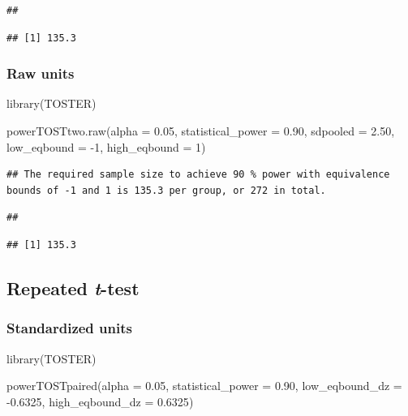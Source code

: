 \documentclass[
]{krantz}
\makeatletter
\newenvironment{Shaded}{\begin{snugshade}}{\end{snugshade}}
\newcommand{\AttributeTok}[1]{\textcolor[rgb]{0.61,0.61,0.61}{#1}}
\newcommand{\DecValTok}[1]{\textcolor[rgb]{0.06,0.06,0.06}{#1}}
\newcommand{\FloatTok}[1]{\textcolor[rgb]{0.06,0.06,0.06}{#1}}
\newcommand{\FunctionTok}[1]{\textcolor[rgb]{0,0,0}{#1}}
\newcommand{\NormalTok}[1]{#1}
\newcommand{\SpecialCharTok}[1]{\textcolor[rgb]{0,0,0}{#1}}
\newenvironment{kframe}{%
\medskip{}
\setlength{\fboxsep}{.8em}
 \def\at@end@of@kframe{}%
 \ifinner\ifhmode%
  \def\at@end@of@kframe{\end{minipage}}%
  \begin{minipage}{\columnwidth}%
 \fi\fi%
 \def\FrameCommand##1{\hskip\@totalleftmargin \hskip-\fboxsep
 \colorbox{shadecolor}{##1}\hskip-\fboxsep
     \hskip-\linewidth \hskip-\@totalleftmargin \hskip\columnwidth}%
 \MakeFramed {\advance\hsize-\width
   \@totalleftmargin\z@ \linewidth\hsize
   \@setminipage}}%
 {\par\unskip\endMakeFramed%
 \at@end@of@kframe}
\renewenvironment{Shaded}{\begin{kframe}}{\end{kframe}}
\makeatother
\begin{document}
\begin{verbatim}
## 
\end{verbatim}

\begin{verbatim}
## [1] 135.3
\end{verbatim}

\hypertarget{raw-units-2}{%
\subsubsection{Raw units}\label{raw-units-2}}

\begin{Shaded}
\begin{Highlighting}[]
\FunctionTok{library}\NormalTok{(TOSTER)}

\FunctionTok{powerTOSTtwo.raw}\NormalTok{(}\AttributeTok{alpha =} \FloatTok{0.05}\NormalTok{,}
                 \AttributeTok{statistical\_power =} \FloatTok{0.90}\NormalTok{,}
                 \AttributeTok{sdpooled =} \FloatTok{2.50}\NormalTok{,}
                 \AttributeTok{low\_eqbound =} \SpecialCharTok{{-}}\DecValTok{1}\NormalTok{,}
                 \AttributeTok{high\_eqbound =} \DecValTok{1}\NormalTok{)}
\end{Highlighting}
\end{Shaded}

\begin{verbatim}
## The required sample size to achieve 90 % power with equivalence bounds of -1 and 1 is 135.3 per group, or 272 in total.
\end{verbatim}

\begin{verbatim}
## 
\end{verbatim}

\begin{verbatim}
## [1] 135.3
\end{verbatim}

\hypertarget{repeated-t-test}{%
\subsection{\texorpdfstring{Repeated \emph{t}-test}{Repeated t-test}}\label{repeated-t-test}}

\hypertarget{standardized-units-4}{%
\subsubsection{Standardized units}\label{standardized-units-4}}

\begin{Shaded}
\begin{Highlighting}[]
\FunctionTok{library}\NormalTok{(TOSTER)}

\FunctionTok{powerTOSTpaired}\NormalTok{(}\AttributeTok{alpha =} \FloatTok{0.05}\NormalTok{,}
                \AttributeTok{statistical\_power =} \FloatTok{0.90}\NormalTok{,}
                \AttributeTok{low\_eqbound\_dz =} \SpecialCharTok{{-}}\FloatTok{0.6325}\NormalTok{,}
                \AttributeTok{high\_eqbound\_dz =} \FloatTok{0.6325}\NormalTok{)}
\end{Highlighting}
\end{Shaded}
\end{document}
